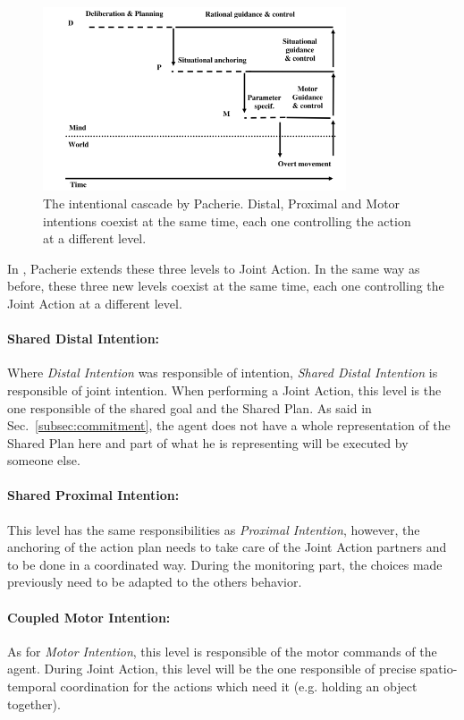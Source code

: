 \documentclass[english,a4paper,11pt,twoside]{StyleThese}
\begin{document}
\begin{figure}[!h]
	\centering
    \includegraphics[width=0.8\textwidth]{figs/Chapter1/Pacherie.png}
    \caption{The intentional cascade by Pacherie. Distal, Proximal and Motor intentions coexist at the same time, each one controlling the action at a different level.}
    \label{fig:Pacherie}
\end{figure}

In \cite{pacherie2011phenomenology}, Pacherie extends these three levels to Joint Action. In the same way as before, these three new levels coexist at the same time, each one controlling the Joint Action at a different level.

\paragraph{Shared Distal Intention:}
Where \textit{Distal Intention} was responsible of intention, \textit{Shared Distal Intention} is responsible of joint intention. When performing a Joint Action, this level is the one responsible of the shared goal and the Shared Plan. As said in Sec.~\ref{subsec:commitment}, the agent does not have a whole representation of the Shared Plan here and part of what he is representing will be executed by someone else.

\paragraph{Shared Proximal Intention:}
This level has the same responsibilities as \textit{Proximal Intention}, however, the anchoring of the action plan needs to take care of the Joint Action partners and to be done in a coordinated way. During the monitoring part, the choices made previously need to be adapted to the others behavior.

\paragraph{Coupled Motor Intention:}
As for \textit{Motor Intention}, this level is responsible of the motor commands of the agent. During Joint Action, this level will be the one responsible of precise spatio-temporal coordination for the actions which need it (e.g. holding an object together).
\end{document}
